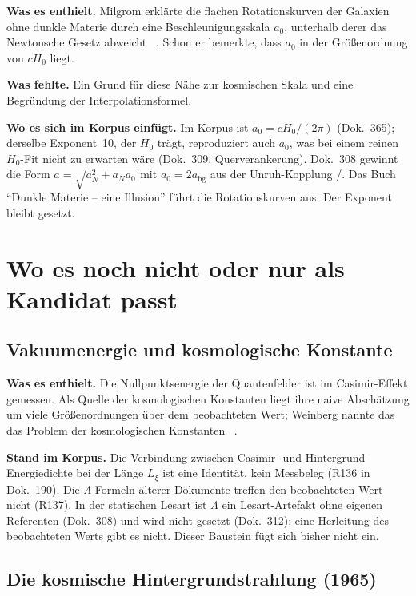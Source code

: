 \textbf{Was es enthielt.} Milgrom erklärte die flachen Rotationskurven der Galaxien ohne dunkle
Materie durch eine Beschleunigungsskala $a_0$, unterhalb derer das Newtonsche Gesetz abweicht
\QM~\cite{Milgrom1983}. Schon er bemerkte, dass $a_0$ in der Größenordnung von $cH_0$ liegt.

\textbf{Was fehlte.} Ein Grund für diese Nähe zur kosmischen Skala und eine Begründung der
Interpolationsformel.

\textbf{Wo es sich im Korpus einfügt.} Im Korpus ist $a_0=cH_0/(2\pi)$ \KM{} (Dok.~365); derselbe
Exponent~10, der $H_0$ trägt, reproduziert auch $a_0$, was bei einem reinen $H_0$-Fit nicht zu
erwarten wäre (Dok.~309, Querverankerung). Dok.~308 gewinnt die Form
$a=\sqrt{a_N^2+a_N a_0}$ mit $a_0=2a_{\mathrm{bg}}$ aus der Unruh-Kopplung \KM/\SM. Das Buch
\enquote{Dunkle Materie -- eine Illusion} führt die Rotationskurven aus. Der Exponent bleibt gesetzt.

\section{Wo es noch nicht oder nur als Kandidat passt}

\subsection{Vakuumenergie und kosmologische Konstante}

\textbf{Was es enthielt.} Die Nullpunktsenergie der Quantenfelder ist im Casimir-Effekt gemessen.
Als Quelle der kosmologischen Konstanten liegt ihre naive Abschätzung um viele Größenordnungen über
dem beobachteten Wert; Weinberg nannte das das Problem der kosmologischen Konstanten
\QM~\cite{Weinberg1989}.

\textbf{Stand im Korpus.} Die Verbindung zwischen Casimir- und Hintergrund-Energiedichte bei der
Länge $L_\xi$ ist eine Identität, kein Messbeleg \SM{} (R136 in Dok.~190). Die $\Lambda$-Formeln
älterer Dokumente treffen den beobachteten Wert nicht \XM{} (R137). In der statischen Lesart ist
$\Lambda$ ein Lesart-Artefakt ohne eigenen Referenten (Dok.~308) und wird nicht gesetzt
(Dok.~312); eine Herleitung des beobachteten Werts gibt es nicht.
Dieser Baustein fügt sich bisher nicht ein.

\subsection{Die kosmische Hintergrundstrahlung (1965)}

